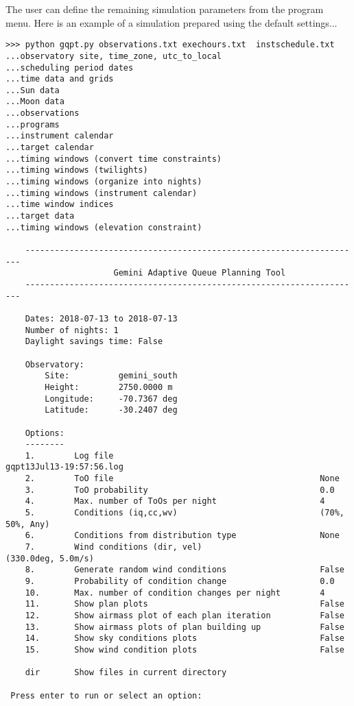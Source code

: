 \documentclass{article}
\begin{document}
The user can define the remaining simulation parameters from the program menu.  Here is an example of a simulation prepared using the default settings...
\begin{lstlisting}
>>> python gqpt.py observations.txt exechours.txt  instschedule.txt 
...observatory site, time_zone, utc_to_local
...scheduling period dates
...time data and grids
...Sun data
...Moon data
...observations
...programs
...instrument calendar
...target calendar
...timing windows (convert time constraints)
...timing windows (twilights)
...timing windows (organize into nights)
...timing windows (instrument calendar)
...time window indices
...target data
...timing windows (elevation constraint)
 
	---------------------------------------------------------------------
	                  Gemini Adaptive Queue Planning Tool
	---------------------------------------------------------------------
	
	Dates: 2018-07-13 to 2018-07-13
	Number of nights: 1
	Daylight savings time: False
	
	Observatory: 
		Site:          gemini_south
		Height:        2750.0000 m
		Longitude:     -70.7367 deg
		Latitude:      -30.2407 deg

	Options:
	--------
	1.        Log file                                     		gqpt13Jul13-19:57:56.log               
	2.        ToO file                                     		None                                    
	3.        ToO probability                              		0.0                                     
	4.        Max. number of ToOs per night                		4                                       
	5.        Conditions (iq,cc,wv)                        		(70%, 50%, Any)                         
	6.        Conditions from distribution type            		None                                    
	7.        Wind conditions (dir, vel)                   		(330.0deg, 5.0m/s)                      
	8.        Generate random wind conditions              		False                                   
	9.        Probability of condition change              		0.0                                     
	10.       Max. number of condition changes per night   		4                                       
	11.       Show plan plots                              		False                                    
	12.       Show airmass plot of each plan iteration     		False                                   
	13.       Show airmass plots of plan building up       		False                                   
	14.       Show sky conditions plots                    		False                                   
	15.       Show wind condition plots                    		False                                   

	dir       Show files in current directory                                                      

 Press enter to run or select an option: 
\end{lstlisting}
\end{document}
